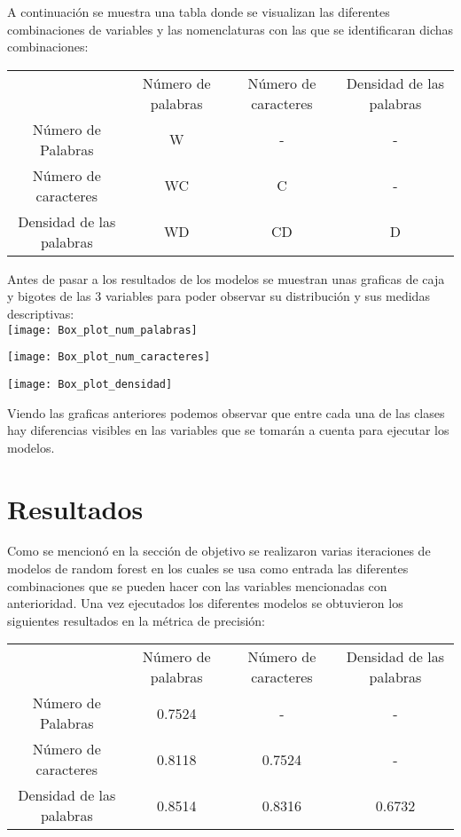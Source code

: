 \documentclass{article}
\begin{document}
	A continuación se muestra una tabla donde se visualizan las diferentes combinaciones de variables y las nomenclaturas con las que se identificaran dichas combinaciones:
	
	\begin{center}
		\begin{tabular}{ c c c c}
			 & Número de palabras & Número de caracteres & Densidad de las palabras \\
			Número de Palabras & W & - & - \\
			Número de caracteres & WC & C & - \\
			Densidad de las palabras & WD & CD & D \\
		\end{tabular}
	\end{center}
	
	Antes de pasar a los resultados de los modelos se muestran unas graficas de caja y bigotes de las 3 variables para poder observar su distribución y sus medidas descriptivas:\\
	
	
	\texttt{[image: Box\_plot\_num\_palabras]}
	
	\texttt{[image: Box\_plot\_num\_caracteres]}
	
	\texttt{[image: Box\_plot\_densidad]}
	
	Viendo las graficas anteriores podemos observar que entre cada una de las clases hay diferencias visibles en las variables que se tomarán a cuenta para ejecutar los modelos.
	
	\section*{Resultados}
	
	Como se mencionó en la sección de objetivo se realizaron varias iteraciones de modelos de random forest en los cuales se usa como entrada las diferentes combinaciones que se pueden hacer con las variables mencionadas con anterioridad. Una vez ejecutados los diferentes modelos se obtuvieron los siguientes resultados en la métrica de precisión:
	
	\begin{center}
		\begin{tabular}{ c c c c}
			& Número de palabras & Número de caracteres & Densidad de las palabras \\
			Número de Palabras & 0.7524 & - & - \\
			Número de caracteres & 0.8118 & 0.7524 & - \\
			Densidad de las palabras & 0.8514 & 0.8316 & 0.6732 \\
		\end{tabular}
	\end{center}
	
\end{document}
